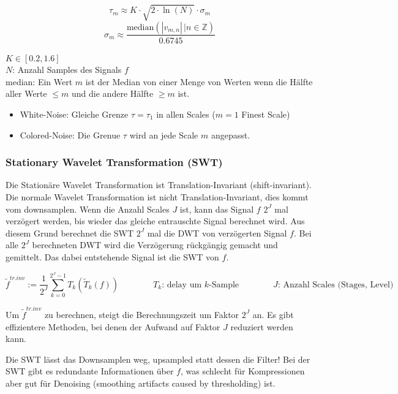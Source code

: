 \begin{minipage}[c]{0.5\textwidth}
\[
	\tau_m \approx K \cdot \sqrt{2 \cdot \ln(N)} \cdot \sigma_m  
\]
\[
	\sigma_m \approx \dfrac{\mathrm{median}(|v_{m,n}| \, | n \in  \mathbb{Z})}{0.6745} 
\]
\end{minipage}
\begin{minipage}[c]{0.5\textwidth}
$K \in [0.2,1.6]$\\
$N$: Anzahl Samples des Signals $f$\\
median: Ein Wert $m$ ist der Median von einer Menge von Werten wenn die Hälfte aller Werte $\leq m$ und die andere Hälfte $\geq m$ ist.
\end{minipage}

\begin{itemize}
	\item White-Noise: Gleiche Grenze $\tau = \tau_1$ in allen Scales ($m=1$ Finest Scale)
	\item Colored-Noise: Die Grenue $\tau$ wird an jede Scale $m$ angepasst.
\end{itemize}


\subsubsection{Stationary  Wavelet Transformation (SWT)}
Die Stationäre Wavelet Transformation ist Translation-Invariant (shift-invariant). Die normale Wavelet Transformation ist nicht Translation-Invariant, dies kommt vom downsamplen. Wenn die Anzahl Scales $J$ ist, kann das Signal $f$ $2^J$ mal verzögert werden, bis wieder das gleiche entrauschte Signal berechnet wird. Aus diesem Grund berechnet die SWT  $2^J$ mal die DWT von verzögerten Signal $f$. Bei alle $2^J$ berechneten DWT wird die Verzögerung rückgängig gemacht und gemittelt. Das dabei entstehende Signal ist die SWT von $f$. 

\[ 
	\tilde{f}^{tr.inv} := \dfrac{1}{2^J} \sum_{k=0}^{2^J-1}T_k \left( \tilde{T}_k(f) \right) 
	\qquad \qquad
	T_k \text{: delay um $k$-Sample} \qquad \qquad J\text{: Anzahl Scales (Stages, Level)}
\]

Um $\tilde{f}^{tr.inv}$ zu berechnen, steigt die Berechnungszeit um Faktor $2^J$ an. Es gibt effizientere Methoden, bei denen der Aufwand auf Faktor $J$ reduziert werden kann.

Die SWT lässt das Downsamplen weg, upsampled statt dessen die Filter! Bei der SWT gibt es redundante Informationen über $f$, was schlecht für Kompressionen aber gut für Denoising (smoothing artifacts caused by thresholding) ist.

